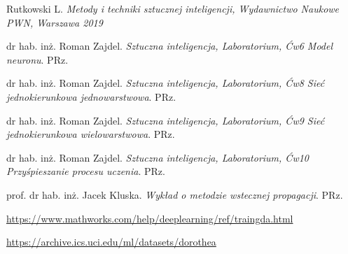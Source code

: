 \documentclass[a4paper, openright, twoside,11pt]{article}
\begin{document}
    \clearpage
    \thispagestyle{empty}
\begin{thebibliography}{9}

Rutkowski L.
\textit{Metody i techniki sztucznej inteligencji, Wydawnictwo Naukowe PWN, Warszawa 2019}

dr hab. inż. Roman Zajdel. 
\textit{Sztuczna inteligencja, Laboratorium, Ćw6 Model neuronu}. 
PRz.

dr hab. inż. Roman Zajdel. 
\textit{Sztuczna inteligencja, Laboratorium, Ćw8 Sieć jednokierunkowa jednowarstwowa}. 
PRz.

dr hab. inż. Roman Zajdel. 
\textit{Sztuczna inteligencja, Laboratorium, Ćw9 Sieć jednokierunkowa wielowarstwowa}. 
PRz.

dr hab. inż. Roman Zajdel. 
\textit{Sztuczna inteligencja, Laboratorium, Ćw10 Przyśpieszanie procesu uczenia}. 
PRz.

prof. dr hab. inż. Jacek Kluska. 
\textit{Wykład o metodzie wstecznej propagacji}. 
PRz.

\url{https://www.mathworks.com/help/deeplearning/ref/traingda.html}

\url{https://archive.ics.uci.edu/ml/datasets/dorothea}

\end{thebibliography}

    \listoffigures
    \lstlistoflistings
\end{document}
